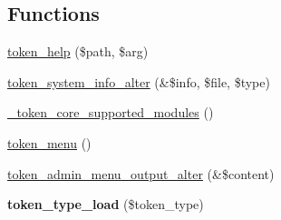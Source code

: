 \subsection*{Functions}
\begin{DoxyCompactItemize}
\item 
\hyperlink{token_8module_a9894cb2ff5f36ce4034e51c75da76de0}{token\_\-help} (\$path, \$arg)
\item 
\hyperlink{token_8module_a9ae1dc9d82981ee97ee1921bebbf59fc}{token\_\-system\_\-info\_\-alter} (\&\$info, \$file, \$type)
\item 
\hyperlink{token_8module_a52a0e3627b37ebbaee0da2b2ac985cf5}{\_\-token\_\-core\_\-supported\_\-modules} ()
\item 
\hyperlink{token_8module_a91896ab13a2135f6efe2fa63697769b2}{token\_\-menu} ()
\item 
\hyperlink{token_8module_af16254da9d5310f0c54f5f9ceabd7891}{token\_\-admin\_\-menu\_\-output\_\-alter} (\&\$content)
\item 
\hypertarget{token_8module_a307d9d349eef4ebc4e5843ae6999664c}{
{\bfseries token\_\-type\_\-load} (\$token\_\-type)}
\label{token_8module_a307d9d349eef4ebc4e5843ae6999664c}


\end{DoxyCompactItemize}
